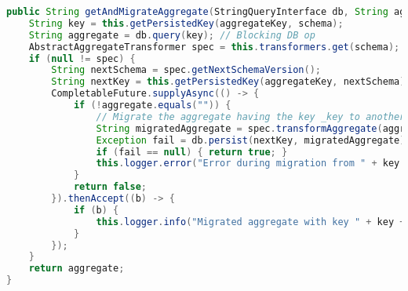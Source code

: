 \begin{lstlisting}[language=Java, caption={Metode for håndtering av GET-spørring i Migrator.}]
public String getAndMigrateAggregate(StringQueryInterface db, String aggregateKey, String schema) {
    String key = this.getPersistedKey(aggregateKey, schema);
    String aggregate = db.query(key); // Blocking DB op
    AbstractAggregateTransformer spec = this.transformers.get(schema);
    if (null != spec) {
        String nextSchema = spec.getNextSchemaVersion();
        String nextKey = this.getPersistedKey(aggregateKey, nextSchema);
        CompletableFuture.supplyAsync(() -> {
            if (!aggregate.equals("")) {
                // Migrate the aggregate having the key _key to another with the key _nextKey using spec
                String migratedAggregate = spec.transformAggregate(aggregate);
                Exception fail = db.persist(nextKey, migratedAggregate);
                if (fail == null) { return true; }
                this.logger.error("Error during migration from " + key + " to " + nextKey + ":\n"+ fail.toString());
            }
            return false;
        }).thenAccept((b) -> {
            if (b) {
                this.logger.info("Migrated aggregate with key " + key + " to " + nextKey);
            }
        });
    }
    return aggregate;
}
\end{lstlisting}
